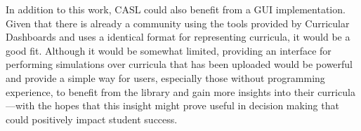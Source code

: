 \documentclass[botnum, fleqn]{unmeethesis}
\begin{document}
  In addition to this work, CASL could also benefit from a GUI implementation. Given that there is already a community using the tools provided by Curricular Dashboards and uses a identical format for representing curricula, it would be a good fit. Although it would be somewhat limited, providing an interface for performing simulations over curricula that has been uploaded would be powerful and provide a simple way for users, especially those without programming experience, to benefit from the library and gain more insights into their curricula---with the hopes that this insight might prove useful in decision making that could positively impact student success.

\vspace{4\baselineskip}\vspace{-\parskip} %
\footnotesize %

\end{document}
